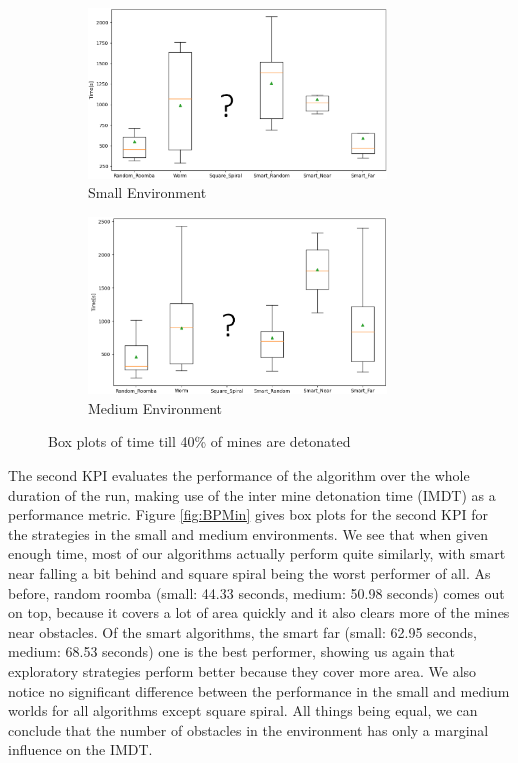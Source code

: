 \documentclass[conference]{IEEEtran}
\begin{document}
\begin{figure}[htbp]
     \centering
     \begin{subfigure}[b]{85mm}
         \centering
         \includegraphics[width=79mm]{Analysis_Small_TimeTill40.png}
         \caption{Small Environment}
         \label{fig:BP40_Small}
     \end{subfigure}
     \begin{subfigure}[b]{85mm}
         \centering
         \includegraphics[width=79mm]{Analysis_Medium_TimeTill40.png}
         \caption{Medium Environment}
         \label{fig:BP40_Medium}
     \end{subfigure}
        \caption{Box plots of time till 40\% of mines are detonated}
        \label{fig:BP40}
\end{figure}

The second KPI evaluates the performance of the algorithm over the whole duration of the run, making use of the inter mine detonation time (IMDT) as a performance metric. Figure \ref{fig:BPMin} gives box plots for the second KPI for the strategies in the small and medium environments. We see that when given enough time, most of our algorithms actually perform quite similarly, with smart near falling a bit behind and square spiral being the worst performer of all. As before, random roomba (small: 44.33 seconds, medium: 50.98 seconds) comes out on top, because it covers a lot of area quickly and it also clears more of the mines near obstacles. Of the smart algorithms, the smart far (small: 62.95 seconds, medium: 68.53 seconds) one is the best performer, showing us again that exploratory strategies perform better because they cover more area. We also notice no significant difference between the performance in the small and medium worlds for all algorithms except square spiral. All things being equal, we can conclude that the number of obstacles in the environment has only a marginal influence on the IMDT.\\
\end{document}
